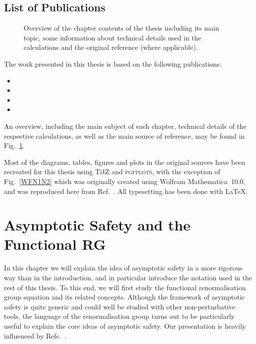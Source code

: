 \documentclass[11pt]{book}
\newcommand{\TikZ}{Ti\emph{k}Z }
\newcommand{\pgfplots}{\textsc{pgfplots}}
\numberwithin{equation}{chapter}
\begin{document}
\section*{List of Publications}

\begin{figure}
  \begin{center}
    
  \end{center}
  \caption{
    Overview of the chapter contents of the thesis including its main topic, some information
    about technical details used in the calculations and the original reference (where applicable).
  }
  \label{fig:overview}
\end{figure}

The work presented in this thesis is based on the following publications:%
\bigskip
\begin{itemize}
  \setlength\itemsep{0.7em}
  \item {}
  \item {}
  \item {}
  \item {}
\end{itemize}
\bigskip
An overview, including the main subject of each chapter, technical details
of the respective calculations, as well as the main source of reference, may be found in
Fig.~\ref{fig:overview}.

Most of the diagrams, tables, figures and plots in the original
sources have been recreated for this thesis using \TikZ and \pgfplots, with the exception
of Fig.~\ref{WFN1N2} which was originally created using Wolfram Mathematica~10.0,
and was reproduced here from Ref.~\cite{Labus:2015ska}.
All typesetting has been done with \LaTeX.



\mainmatter
\chapter[Asymptotic Safety and the Functional Renormalisation Group]{Asymptotic Safety and the Functional RG}

In this chapter we will explain the idea of asymptotic safety in a
more rigorous way than in the introduction,
and in particular introduce the notation
used in the rest of this thesis.
To this end, we will first study the functional renormalisation group
equation and its related concepts.
Although the framework of asymptotic safety is quite generic
and could well be studied with other non-perturbative tools, the
language of the renormalisation group turns out to be particularly useful
to explain the core ideas of asymptotic safety.
Our presentation is heavily influenced by
Refs.~\cite{Percacci:2011fr, percacci2017introduction}.
\end{document}
